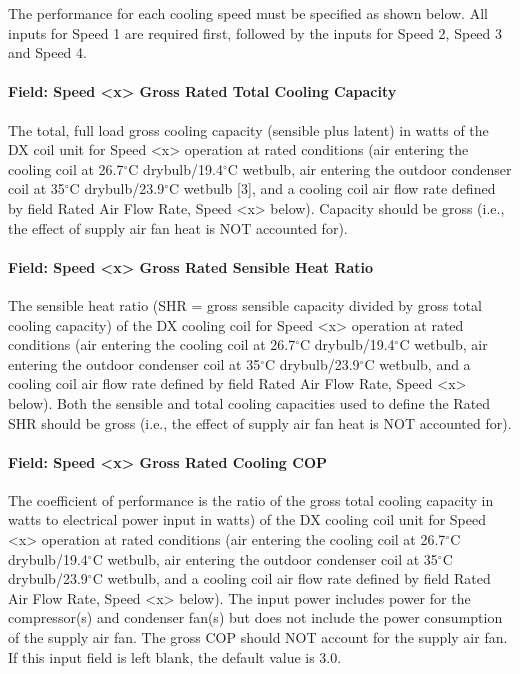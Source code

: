 The performance for each cooling speed must be specified as shown below. All inputs for Speed 1 are required first, followed by the inputs for Speed 2, Speed 3 and Speed 4.

\paragraph{Field: Speed \textless{}x\textgreater{} Gross Rated Total Cooling Capacity}\label{field-speed-x-gross-rated-total-cooling-capacity}

The total, full load gross cooling capacity (sensible plus latent) in watts of the DX coil unit for Speed \textless{}x\textgreater{} operation at rated conditions (air entering the cooling coil at 26.7$^\circ$C drybulb/19.4$^\circ$C wetbulb, air entering the outdoor condenser coil at 35$^\circ$C drybulb/23.9$^\circ$C wetbulb {[}3{]}, and a cooling coil air flow rate defined by field Rated Air Flow Rate, Speed \textless{}x\textgreater{} below). Capacity should be gross (i.e., the effect of supply air fan heat is NOT accounted for).

\paragraph{Field: Speed \textless{}x\textgreater{} Gross Rated Sensible Heat Ratio}\label{field-speed-x-gross-rated-sensible-heat-ratio}

The sensible heat ratio (SHR = gross sensible capacity divided by gross total cooling capacity) of the DX cooling coil for Speed \textless{}x\textgreater{} operation at rated conditions (air entering the cooling coil at 26.7$^\circ$C drybulb/19.4$^\circ$C wetbulb, air entering the outdoor condenser coil at 35$^\circ$C drybulb/23.9$^\circ$C wetbulb, and a cooling coil air flow rate defined by field Rated Air Flow Rate, Speed \textless{}x\textgreater{} below). Both the sensible and total cooling capacities used to define the Rated SHR should be gross (i.e., the effect of supply air fan heat is NOT accounted for).

\paragraph{Field: Speed \textless{}x\textgreater{} Gross Rated Cooling COP}\label{field-speed-x-gross-rated-cooling-cop}

The coefficient of performance is the ratio of the gross total cooling capacity in watts to electrical power input in watts) of the DX cooling coil unit for Speed \textless{}x\textgreater{} operation at rated conditions (air entering the cooling coil at 26.7$^\circ$C drybulb/19.4$^\circ$C wetbulb, air entering the outdoor condenser coil at 35$^\circ$C drybulb/23.9$^\circ$C wetbulb, and a cooling coil air flow rate defined by field Rated Air Flow Rate, Speed \textless{}x\textgreater{} below). The input power includes power for the compressor(s) and condenser fan(s) but does not include the power consumption of the supply air fan. The gross COP should NOT account for the supply air fan. If this input field is left blank, the default value is 3.0.

